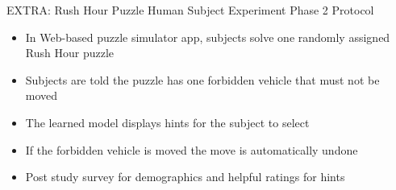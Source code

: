 \begin{frame}{EXTRA: Rush Hour Puzzle Human Subject Experiment Phase 2 Protocol}
\begin{itemize}
\item In Web-based puzzle simulator app, subjects solve one randomly assigned Rush Hour puzzle
\item Subjects are told the puzzle has one forbidden vehicle that must not be moved
\item The learned model displays hints for the subject to select
\item If the forbidden vehicle is moved the move is  automatically undone
\item Post study survey for demographics and helpful ratings for hints
\end{itemize}

\end{frame}